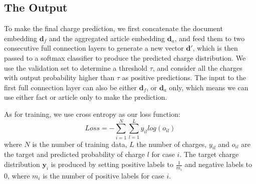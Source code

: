 \subsection{The Output}
To make the final charge prediction, we first concatenate the document embedding $\mathbf{d}_f$ and the aggregated article embedding $\mathbf{d}_a$, and feed them to two consecutive full connection layers to generate a new vector $\mathbf{d}'$, which is then passed to a softmax classifier to produce the predicted charge distribution. We use the validation set to determine a threshold $\tau$, and consider all the charges with output probability higher than $\tau$ as positive predictions.
The input to the first full connection layer can also be either $\mathbf{d}_f$, or $\mathbf{d}_a$ only, which means we can use either fact or article only to make the prediction.

As for training, we use cross entropy as our loss function:
\begin{equation}
\label{original_loss}
Loss= -\sum_{i=1}^N\sum_{l=1}^L{y_{il} log(o_{il})}
\end{equation} 
where $N$ is the number of training data, $L$ the number of charges, $y_{il}$ and $o_{il}$ are the target and predicted probability of charge $l$ for case $i$. The target charge distribution $\mathbf{y}_i$ is produced by setting positive labels to $\frac{1}{m_i}$ and negative labels to $0$, where $m_i$ is the number of positive labels for case $i$.

